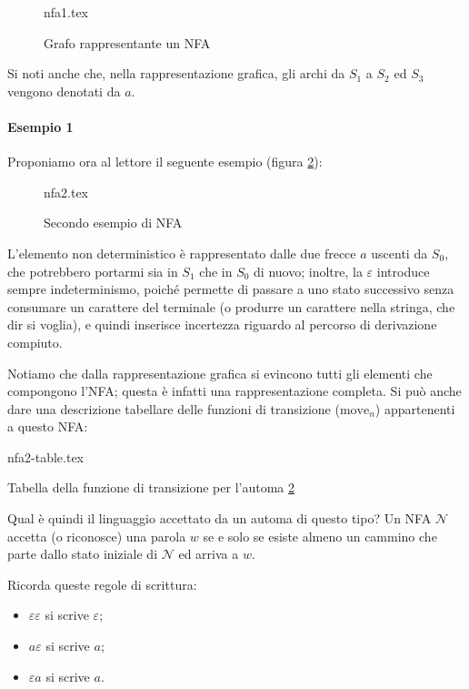 \documentclass[class=book, crop=false, oneside, 12pt]{standalone}
\begin{document}
\begin{figure}[H]
	\centering
	{nfa1.tex}
    \caption{Grafo rappresentante un NFA}
	\label{nfa_grafo_esempio}
\end{figure}

\noindent Si noti anche che, nella rappresentazione grafica, gli archi da \(S_1\) a \(S_2\) ed \(S_3\) vengono denotati da \(a\).

\paragraph{Esempio 1}
Proponiamo ora al lettore il seguente esempio (figura \ref{nfa_grafo_2}):
\begin{figure}[H]
    \centering
    {nfa2.tex}
    \caption{Secondo esempio di NFA}
    \label{nfa_grafo_2}
\end{figure}
L’elemento non deterministico è rappresentato dalle due frecce \(a\) uscenti da \(S_0\), che potrebbero portarmi sia in \(S_1\) che in \(S_0\) di nuovo; inoltre, la \(\varepsilon\) introduce sempre indeterminismo, poiché permette di passare a uno stato successivo senza consumare un carattere del terminale (o produrre un carattere nella stringa, che dir si voglia), e quindi inserisce incertezza riguardo al percorso di derivazione compiuto.

Notiamo che dalla rappresentazione grafica si evincono tutti gli elementi che compongono l’NFA; questa è infatti una rappresentazione completa.
Si può anche dare una descrizione tabellare delle funzioni di transizione (\(\textrm{move}_n\)) appartenenti a questo NFA:

\begin{table}[H]
	\centering
	{nfa2-table.tex}
    \caption{Tabella della funzione di transizione per l'automa \ref{nfa_grafo_2}}
    \label{nfa2-table}
\end{table} 

Qual è quindi il linguaggio accettato da un automa di questo tipo?\label{linguaggio_definito_da_un_automa} 
Un NFA \(\mathcal{N}\) accetta (o riconosce) una parola \(w\) se e solo se esiste almeno un cammino che parte dallo stato iniziale di \(\mathcal{N}\) ed arriva a \(w\).

Ricorda queste regole di scrittura:
\begin{itemize}
    \item \(\varepsilon \varepsilon\) si scrive \(\varepsilon\);
    \item \(a\varepsilon\) si scrive \(a\);
    \item \(\varepsilon a\) si scrive \(a\).
\end{itemize}
\end{document}
